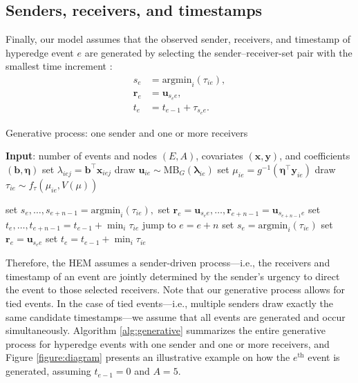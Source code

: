 \documentclass[ba]{imsart}
\def\spacingset#1{\renewcommand{\baselinestretch}%
	{#1}\small\normalsize} \spacingset{1}
\numberwithin{equation}{section}
\theoremstyle{plain}
\begin{document}
	\subsection{Senders, receivers, and timestamps}\label{subsec:Observed}
	Finally, our model assumes that the observed sender, receivers, and timestamp of hyperedge event $e$ are generated by selecting the sender--receiver-set pair with the smallest time increment \citep{snijders1996stochastic}:
	\begin{equation}
		\begin{aligned}
			s_e &= \mbox{argmin}_{i}(\tau_{ie}),\\
			\boldsymbol{r}_e &= \boldsymbol{u}_{s_e e},\\
			t_e &=t_{e-1} + \tau_{s_e e}.
		\end{aligned}
	\end{equation}
	\begin{algorithm}[!t]
		\spacingset{1}
		\SetAlgoLined
		\caption{Generative process: one sender and one or more receivers}
		\begin{algorithmic}
			\STATE \textbf{Input}: number of events and nodes $(E, A)$, covariates $(\boldsymbol{x}, \boldsymbol{y})$, and coefficients $(\boldsymbol{b}, \boldsymbol{\eta})$
			\vskip 0.1in
			\STATE	set $\lambda_{iej} = {\boldsymbol{b}}^{\top}\boldsymbol{x}_{iej}$
			\ENDFOR
			\STATE	draw $\boldsymbol{u}_{ie}  \sim
			\mbox{MB}_G(\boldsymbol{\lambda}_{ie})$
			\STATE		set $\mu_{ie} = g^{-1}(\boldsymbol{\eta}^\top \boldsymbol{y}_{ie})$
			\STATE		draw $\tau_{ie} \sim f_\tau(\mu_{ie}, V(\mu))$
			\ENDFOR
			
			\STATE	set $s_e,\ldots, s_{e+n-1}=\mbox{argmin}_{i}(\tau_{ie}),$
			\STATE	set $\boldsymbol{r}_e=\boldsymbol{u}_{s_e e},\ldots,\boldsymbol{r}_{e+n-1}=\boldsymbol{u}_{s_{e+n-1} e}$
			\STATE	set $t_e, \ldots, t_{e+n-1}=t_{e-1} + \min_i\tau_{ie}$
			\STATE		jump to $e = e+n$
			\ELSE
			\STATE	set $s_e= \mbox{argmin}_{i}(\tau_{ie})$
			\STATE		set $\boldsymbol{r}_e = \boldsymbol{u}_{s_e e}$
			\STATE	set $t_e =t_{e-1} + \min_i\tau_{ie}$
			\ENDIF
			\ENDFOR
		\end{algorithmic}
		\label{alg:generative}
	\end{algorithm}
		Therefore, the HEM assumes a sender-driven process---i.e., the receivers and timestamp of an event are jointly determined by the sender's urgency to direct the event to those selected receivers. Note that our generative process allows for tied events. In the case of tied events---i.e., multiple senders draw exactly the same candidate timestamps---we assume that all events are generated and occur simultaneously. Algorithm \ref{alg:generative} summarizes the entire generative process for hyperedge events with one sender and one or more receivers, and Figure \ref{figure:diagram} presents an illustrative example on how the $e^{\textrm{th}}$ event is generated, assuming $t_{e-1} = 0$ and $A=5$.~	
\end{document}
